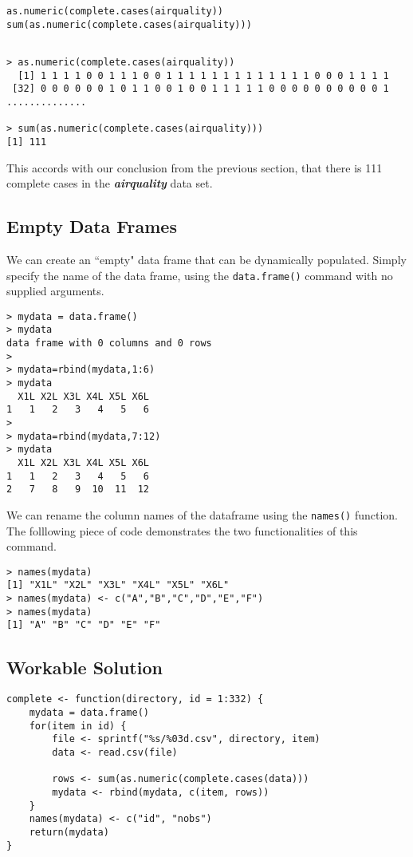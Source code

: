 \documentclass[]{article}
\begin{document}
\begin{framed}
\begin{verbatim}
as.numeric(complete.cases(airquality))
sum(as.numeric(complete.cases(airquality)))
\end{verbatim}
\end{framed}
\begin{verbatim}

> as.numeric(complete.cases(airquality))
  [1] 1 1 1 1 0 0 1 1 1 0 0 1 1 1 1 1 1 1 1 1 1 1 1 1 0 0 0 1 1 1 1
 [32] 0 0 0 0 0 0 1 0 1 1 0 0 1 0 0 1 1 1 1 1 0 0 0 0 0 0 0 0 0 0 1
..............

> sum(as.numeric(complete.cases(airquality)))
[1] 111
\end{verbatim}

\noindent This accords with our conclusion from the previous section, that there is 111 complete cases in the \textit{\textbf{airquality}} data set.
\newpage
\subsection{Empty Data Frames}
We can create an ``empty" data frame that can be dynamically populated. Simply specify the name of the data frame, using the \texttt{data.frame()} command with no supplied arguments.
\begin{verbatim}
> mydata = data.frame()
> mydata
data frame with 0 columns and 0 rows
> 
> mydata=rbind(mydata,1:6)
> mydata
  X1L X2L X3L X4L X5L X6L
1   1   2   3   4   5   6
>
> mydata=rbind(mydata,7:12)
> mydata
  X1L X2L X3L X4L X5L X6L
1   1   2   3   4   5   6
2   7   8   9  10  11  12
\end{verbatim}

We can rename the column names of the dataframe using the \texttt{names()} function. The folllowing piece of code demonstrates the two functionalities of this command.

\begin{verbatim}
> names(mydata)
[1] "X1L" "X2L" "X3L" "X4L" "X5L" "X6L"
> names(mydata) <- c("A","B","C","D","E","F")
> names(mydata)
[1] "A" "B" "C" "D" "E" "F"
\end{verbatim}
\newpage
\subsection{Workable Solution}
\begin{framed}
\begin{verbatim}
complete <- function(directory, id = 1:332) {
    mydata = data.frame()
    for(item in id) {
        file <- sprintf("%s/%03d.csv", directory, item)
        data <- read.csv(file)
        
        rows <- sum(as.numeric(complete.cases(data)))
        mydata <- rbind(mydata, c(item, rows))
    }
    names(mydata) <- c("id", "nobs")
    return(mydata)
}
\end{verbatim}
\end{framed} 
\newpage
\end{document}
